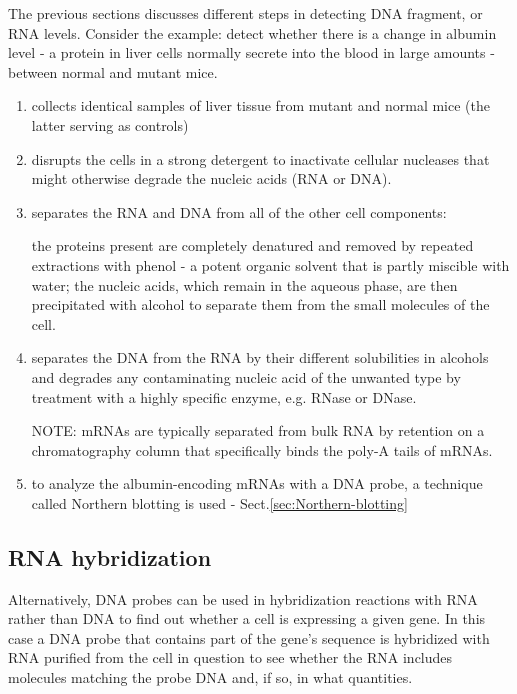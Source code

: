 The previous sections discusses different steps in detecting DNA fragment, or
RNA levels. Consider the example: detect whether there is a change in albumin
level - a protein in liver cells normally secrete into the blood in large
amounts - between normal and mutant mice.
\begin{enumerate}
  \item collects identical samples of liver tissue from mutant and normal mice
  (the latter serving as controls) 
  
  \item disrupts the cells in a strong detergent to inactivate cellular
  nucleases that might otherwise degrade the nucleic acids (RNA or DNA). 
  
  \item separates the RNA and DNA from all of the other cell components: 
  
  the proteins present are completely denatured and removed by repeated
  extractions with phenol - a potent organic solvent that is partly miscible
  with water; the nucleic acids, which remain in the aqueous phase, are then
  precipitated with alcohol to separate them from the small molecules of the
  cell.
  
  \item separates the DNA from the RNA by their different solubilities in
  alcohols and degrades any contaminating nucleic acid of the unwanted type by
  treatment with a highly specific enzyme, e.g. RNase or DNase. 
  
  NOTE:  mRNAs are typically separated from bulk RNA by retention on a
  chromatography column that specifically binds the poly-A tails of mRNAs.
  
  
  \item to analyze the albumin-encoding mRNAs with a DNA probe, a technique
  called Northern blotting is used - Sect.\ref{sec:Northern-blotting}
  
\end{enumerate}

\subsection{RNA hybridization}

Alternatively, DNA probes can be used in hybridization reactions with RNA rather
than DNA to find out whether a cell is expressing a given gene. In this case a
DNA probe that contains part of the gene's sequence is hybridized with RNA
purified from the cell in question to see whether the RNA includes molecules
matching the probe DNA and, if so, in what quantities.   

